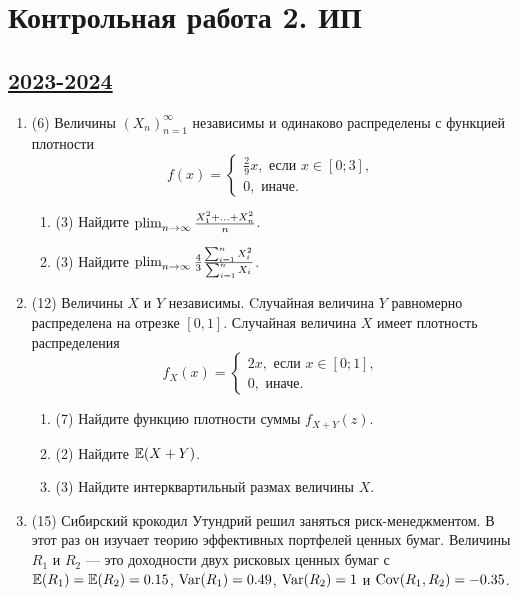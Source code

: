 \newpage
\thispagestyle{empty}
\section{Контрольная работа 2. ИП}

\subsection[2023-2024]{\hyperref[sec:sol_kr_02_ip_2023_2024]{2023-2024}}
\label{sec:kr_02_ip_2023_2024}

\begin{enumerate}
	\item  (6) Величины $(X_n)_{n=1}^{\infty}$ независимы и одинаково распределены с функцией плотности
	\[
	f(x)=\begin{cases}
	\frac{2}{9} x,  \text { если }  x \in[0 ; 3], \\
	0,  \text { иначе. }
	\end{cases}
	\]
	
	 \begin{enumerate}
	\item   (3) Найдите $\operatorname*{plim}_{n \to \infty} \frac{X_1^2+\ldots+X_n^2}{n}$.
	\item   (3) Найдите $\operatorname*{plim}_{n \to \infty} \frac{4}{3} \frac{\sum_{i=1}^n X_i^2}{\sum_{i=1}^n X_i}$.
	\end{enumerate}
	
	\item  (12) Величины $X$ и $Y$ независимы. 
	Cлучайная величина $Y$ равномерно распределена на отрезке $[0, 1]$.
	Случайная величина $X$ имеет плотность распределения
	\[
	f_X(x)=\begin{cases}
	2 x,  \text { если }  x \in[0 ; 1], \\
	0,  \text { иначе. }  
	\end{cases}
	\]
	
	 \begin{enumerate}
	\item  (7) Найдите функцию плотности суммы $f_{X+Y}(z)$.
	\item (2) Найдите $\operatorname{\mathbb{E}}(X+Y)$.
	\item  (3) Найдите интерквартильный размах величины  $X$.
	\end{enumerate}
	
	
	\item (15) Сибирский крокодил Утундрий решил заняться риск-менеджментом. 
	 В этот раз он изучает теорию эффективных портфелей ценных бумаг. 
	 Величины $R_1$ и $R_2$ — это доходности двух рисковых ценных бумаг с 
	 $\operatorname{\mathbb{E}}(R_1) = \operatorname{\mathbb{E}}(R_2) = 0.15$, $\operatorname{Var}(R_1) = 0.49$, $\operatorname{Var}(R_2)=1$ и $\operatorname{Cov}(R_1, R_2) = -0.35$.
	

\end{enumerate}
